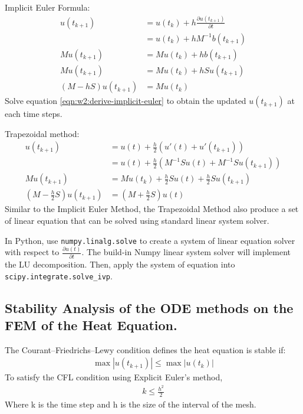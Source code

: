 \documentclass{article}
\begin{document}
Implicit Euler Formula:
\begin{align}
  u(t_{k+1}) &= u(t_k) + h \frac{\partial u(t_{k+1})}{\partial t} \\
             &= u(t_k) + h M^{-1} b(t_{k+1}) \\
  M u(t_{k+1}) &= M u(t_k) + hb(t_{k+1}) \\
  M u(t_{k+1}) &= M u(t_k) + h S u(t_{k+1}) \\
  (M - h S) u(t_{k+1}) &= M u(t_k) \label{eqn:w2:derive-implicit-euler}
\end{align}
Solve equation \ref{eqn:w2:derive-implicit-euler} to obtain the updated $u(t_{k+1})$ at each time steps.

Trapezoidal method:
\begin{align}
  u(t_{k+1}) &= u(t) + \frac{h}{2} \left(u'(t) + u'(t_{k+1}) \right) \\
             &= u(t) + \frac{h}{2} \left( M^{-1} S u(t) + M^{-1} S u(t_{k+1}) \right) \\
  M u(t_{k+1}) &= M u(t_k) + \frac{h}{2} S u(t) + \frac{h}{2} S u(t_{k+1}) \\
  \left(M - \frac{h}{2}S \right) u(t_{k+1}) &= \left( M + \frac{h}{2}S \right) u(t) \label{eqn:w2:derived-trapezoidal-method}
\end{align}
Similar to the Implicit Euler Method, the Trapezoidal Method also produce a set of linear equation that can be solved using standard linear system solver.

In Python, use \texttt{numpy.linalg.solve} to create a system of linear equation solver with respect to $\frac{\partial u(t)}{\partial t}$. The build-in Numpy linear system solver will implement the LU decomposition. Then, apply the system of equation into \texttt{scipy.integrate.solve\_ivp}.


\subsection{Stability Analysis of the ODE methods on the FEM of the Heat Equation.}%
\label{sub:Stability Analysis of the ODE methods on the FEM of the Heat Equation.}
The Courant–Friedrichs–Lewy condition defines the heat equation is stable if:
\begin{align}
  \max |u(t_{k+1})| \le \max |u(t_k)|
\end{align}
To satisfy the CFL condition using Explicit Euler's method,
\begin{align}
  k \le \frac{h^2}{2}
\end{align}
Where k is the time step and h is the size of the interval of the mesh.
\end{document}
